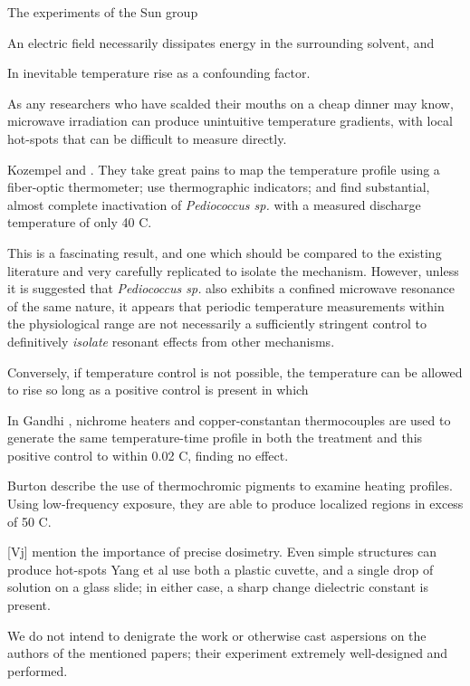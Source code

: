 \documentclass[paper.tex]{subfiles}
\begin{document}
\begin{multicols}{1}
The experiments of the Sun group 

An electric field necessarily dissipates energy in the surrounding solvent, and 

In inevitable temperature rise as a confounding factor. 

As any researchers who have scalded their mouths on a cheap dinner may know, microwave irradiation can produce unintuitive temperature gradients, with local hot-spots that can be difficult to measure directly.

Kozempel \cite{Preliminary1997} and \cite{Inactivationa}. They take great pains to map the temperature profile using a fiber-optic thermometer; use thermographic indicators; and find substantial, almost complete inactivation of {\it Pediococcus sp.} with a measured discharge temperature of only 40 C.

This is a fascinating result, and one which should be compared to the existing literature and very carefully replicated to isolate the mechanism. However, unless it is suggested that {\it Pediococcus sp.} also exhibits a confined microwave resonance of the same nature, it appears that periodic temperature measurements within the physiological range are not necessarily a sufficiently stringent control to definitively {\it isolate} resonant effects from other mechanisms.

Conversely, if temperature control is not possible, the temperature can be allowed to rise so long as a positive control is present in which 

In Gandhi \cite{Basic1983}, nichrome heaters and copper-constantan thermocouples are used to generate the same temperature-time profile in both the treatment and this positive control to within 0.02 C, finding no effect. 

Burton\cite{Effects1950} describe the use of thermochromic pigments to examine heating profiles. Using low-frequency exposure, they are able to produce localized regions in excess of 50 C.






[Vj] mention the importance of precise dosimetry. Even simple structures can produce hot-spots 
Yang et al use both a plastic cuvette, and a single drop of solution on a glass slide; in either case, a sharp change dielectric constant is present.


We do not intend to denigrate the work or otherwise cast aspersions on the authors of the mentioned papers; their experiment extremely well-designed and performed. 


\end{multicols}
\end{document}
